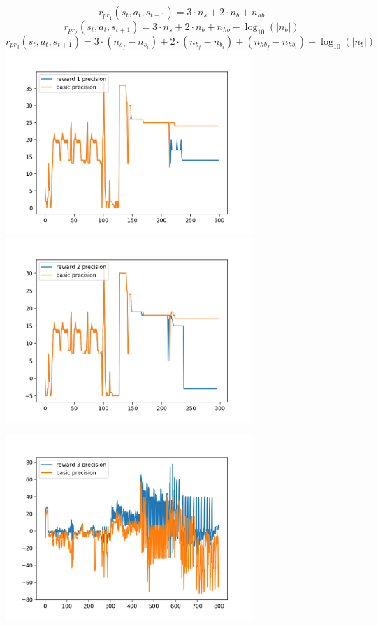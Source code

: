 \begin{equation}
		r_{pr_1}(s_t,a_t,s_{t+1}) = 3  \cdot n_s + 2 \cdot n_b + n_{hb}
\end{equation}
\begin{equation}
		r_{pr_2}(s_t,a_t,s_{t+1}) = 3  \cdot n_s + 2 \cdot n_b + n_{hb} - \log_{10}(|n_b|)
\end{equation}
\begin{equation}
		r_{pr_3}(s_t,a_t,s_{t+1}) = 3  \cdot (n_{s_f} - n_{s_i}) + 2 \cdot (n_{b_f} - n_{b_i}) + (n_{hb_f} - n_{hb_i}) - \log_{10}(|n_b|)
\end{equation}
\includegraphics*[height=7cm]{figures/r1}
\includegraphics*[height=7cm]{figures/r2}
\begin{center}
	\includegraphics*[height=7cm]{figures/r3}
\end{center}


